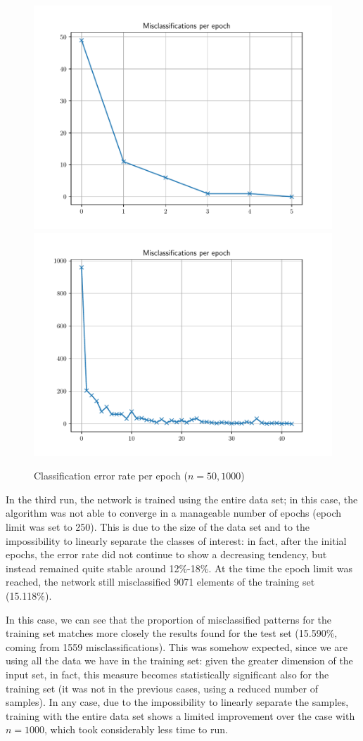 \documentclass[letterpaper,headings=standardclasses]{scrartcl}
\begin{document}
\begin{figure}[h]
\centering
\includegraphics[width=.49\linewidth]{errors_50.pdf}
\includegraphics[width=.49\linewidth]{errors_1000.pdf}
\caption{Classification error rate per epoch ($n = 50, 1000$)}
\label{errors_50_1000}
\end{figure}

In the third run, the network is trained using the entire data set; in this case, the algorithm was not able to converge in a manageable number of epochs (epoch limit was set to 250). This is due to the size of the data set and to the impossibility to linearly separate the classes of interest: in fact, after the initial epochs, the error rate did not continue to show a decreasing tendency, but instead remained quite stable around 12\%-18\%. At the time the epoch limit was reached, the network still misclassified 9071 elements of the training set (15.118\%). 

In this case, we can see that the proportion of misclassified patterns for the training set matches more closely the results found for the test set (15.590\%, coming from 1559 misclassifications). This was somehow expected, since we are using all the data we have in the training set: given the greater dimension of the input set, in fact, this measure becomes statistically significant also for the training set (it was not in the previous cases, using a reduced number of samples). In any case, due to the impossibility to linearly separate the samples, training with the entire data set shows a limited improvement over the case with $n = 1000$, which took considerably less time to run.
\end{document}
